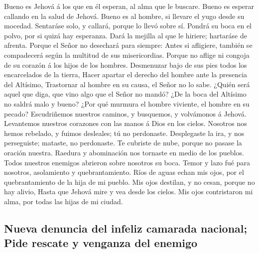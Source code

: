  Bueno es Jehová á los que en él esperan, al alma que le
buscare.  Bueno es esperar callando en la salud de
Jehová.  Bueno es al hombre, si llevare el yugo desde su
mocedad.  Sentaráse solo, y callará, porque lo llevó
sobre sí.  Pondrá su boca en el polvo, por si quizá hay
esperanza.  Dará la mejilla al que le hiriere; hartaráse
de afrenta.  Porque el Señor no desechará para siempre:
 Antes si afligiere, también se compadecerá según la
multitud de sus misericordias.  Porque no aflige ni
congoja de su corazón á los hijos de los hombres. 
Desmenuzar bajo de sus pies todos los encarcelados de la tierra,
 Hacer apartar el derecho del hombre ante la presencia
del Altísimo,  Trastornar al hombre en su causa, el Señor
no lo sabe.  ¿Quién será aquel que diga, que vino algo
que el Señor no mandó?  ¿De la boca del Altísimo no
saldrá malo y bueno?  ¿Por qué murmura el hombre
viviente, el hombre en su pecado?  Escudriñemos nuestros
caminos, y busquemos, y volvámonos á Jehová.  Levantemos
nuestros corazones con las manos á Dios en los cielos. 
Nosotros nos hemos rebelado, y fuimos desleales; tú no perdonaste.
 Desplegaste la ira, y nos perseguiste; mataste, no
perdonaste.  Te cubriste de nube, porque no pasase la
oración nuestra.  Raedura y abominación nos tornaste en
medio de los pueblos.  Todos nuestros enemigos abrieron
sobre nosotros su boca.  Temor y lazo fué para nosotros,
asolamiento y quebrantamiento.  Ríos de aguas echan mis
ojos, por el quebrantamiento de la hija de mi pueblo. 
Mis ojos destilan, y no cesan, porque no hay alivio, 
Hasta que Jehová mire y vea desde los cielos.  Mis ojos
contristaron mi alma, por todas las hijas de mi ciudad.

\hypertarget{nueva-denuncia-del-infeliz-camarada-nacional-pide-rescate-y-venganza-del-enemigo}{%
\subsection{Nueva denuncia del infeliz camarada nacional; Pide rescate y
venganza del
enemigo}\label{nueva-denuncia-del-infeliz-camarada-nacional-pide-rescate-y-venganza-del-enemigo}}

